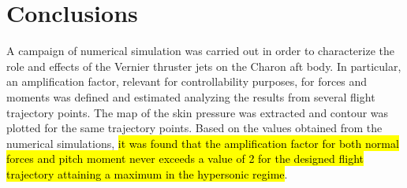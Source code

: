 \documentclass[12pt]{article}
\begin{document}
\begin{table}[H]
\centering
\caption{Moment contributions from different components under various configurations (in Nm) at $t=136s$ w.r.t. the base.}
\end{table}

\section{Conclusions}\label{sec:conclusions}
A campaign of numerical simulation was carried out in order to characterize the role and effects of the Vernier thruster jets on the Charon aft body. In particular, an amplification factor, relevant for controllability purposes, for forces and moments was defined and estimated analyzing the results from several flight trajectory points. The map of the skin pressure was extracted and contour was plotted for the same trajectory points. Based on the values obtained from the numerical simulations, \hl{it was found that the amplification factor for both normal forces and pitch moment never exceeds a value of 2 for the designed flight trajectory attaining a maximum in the hypersonic regime}. %
\end{document}
